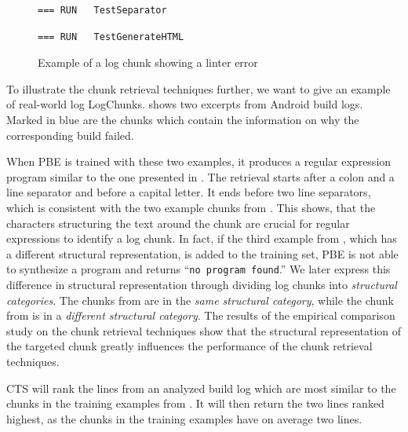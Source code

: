\begin{figure}[tbp]
  \centering
  \begin{lstlisting}[breaklines=true,frame=tlr]
=== RUN   TestSeparator
  \end{lstlisting}
  \vspace{-\baselineskip}
  
  \vspace{-\baselineskip}
  \begin{lstlisting}[breaklines=true,frame=blr]
=== RUN   TestGenerateHTML
  \end{lstlisting}
  \caption{Example of a log chunk showing a linter error}
  \label{lst:chunk-example-3}
\end{figure}

To illustrate the chunk retrieval techniques further, we want to give
an example of real-world log LogChunks.
 shows two excerpts
from Android build logs.
Marked in blue are the chunks
which contain the information on why the
corresponding build failed.

When PBE is trained with these two examples, it produces
a regular expression program similar to the one presented in
.
The retrieval
starts after a colon and a line separator and before a capital
letter.
It ends before two line separators,
which is consistent with the two example
chunks from .
This shows, that the characters structuring the text around the chunk are
crucial for regular expressions to identify a log chunk.
In fact, if the third example from ,
which has a
different structural representation, is added to the training set,
PBE is not able to synthesize a program and returns
``\texttt{no program found}.''
We later express this difference in structural representation through
dividing log chunks into \emph{structural categories}.
The chunks from 
are in the \emph{same structural category}, while the chunk from
 is in a
\emph{different structural category}.
The results of the empirical comparison study on the chunk retrieval
techniques
show that the structural representation of the targeted chunk greatly
influences
the performance of the chunk retrieval techniques.

CTS will rank the lines from an analyzed build log which are most
similar to the chunks in the training examples
from .
It will then return the two lines ranked highest, as the chunks in
the training examples have on average two lines.

